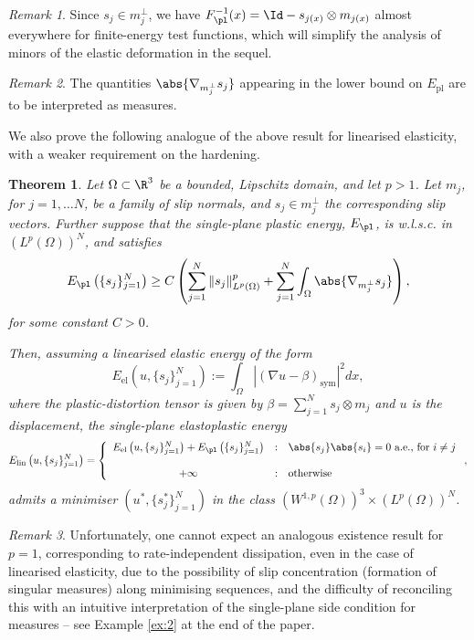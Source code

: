 \documentclass[11pt,reqno]{amsart}
\theoremstyle{plain}
\newtheorem{theorem}{Theorem}
\theoremstyle{definition}
\theoremstyle{remark}
\newtheorem{remark}{Remark}
\begin{document}
\begin{remark}
Since $s_j\in m_j^{\perp}$, we have $F_\pl^{-1}(x) = \Id - s_{j(x)}\otimes m_{j(x)}$ almost everywhere for finite-energy test functions, which will simplify the analysis of minors of the elastic deformation in the sequel.
\end{remark}


\begin{remark}
The quantities $\abs{\nabla_{m_j^\perp} s_j}$ appearing in the lower bound on $E_{\mathrm{pl}}$ are to be interpreted as measures.
\end{remark}

We also prove the following analogue of the above result for linearised elasticity, with a weaker requirement on the hardening.

\begin{theorem}\label{thm:main_lin}
Let $\Omega \subset \R^3$ be a bounded, Lipschitz domain, and let $p>1$. Let $m_j$, for $j=1,\ldots N$, be a family of slip normals, and $s_j\in m_j^{\perp}$ the corresponding slip vectors. Further suppose that the single-plane plastic energy, $E_\pl$, is w.l.s.c. in $(L^p(\Omega))^N$, and satisfies 
\[
E_\pl\left(\{s_j\}_{j=1}^N\right)\geq C\left(\sum_{j=1}^N \|{s_j}\|_{L^p(\Omega)}^p + \sum_{j=1}^N\int_{\Omega}\abs{\nabla_{m_j^\perp} s_j}\right),
\]
for some constant $C>0$.

Then, assuming a linearised elastic energy of the form
\[
E_{\mathrm{el}}\left(u, \{s_j\}_{j=1}^N\right):= \int_{\Omega} \left|(\nabla u - \beta)_{\mathrm{sym}}\right|^2 dx,
\]
where the plastic-distortion tensor is given by $\beta = \sum_{j=1}^N s_j \otimes m_j$ and $u$ is the displacement, the single-plane elastoplastic energy
\[
E_{\mathrm{lin}}\left(u, \{s_j\}_{j=1}^N\right) =  \left\{\begin{array}{ccl}
 E_{\mathrm{el}}\left(u, \{s_j\}_{j=1}^N\right) + E_\pl\left(\{s_j\}_{j=1}^N\right) & : & \abs{s_j}\abs{s_i} = 0~\textrm{a.e., for}~i\neq j\\
 & & \\
 +\infty & : & \mathrm{otherwise}
\end{array} \right.,
\]
admits a minimiser $\left(u^{\ast},\{s^{\ast}_j\}_{j=1}^N\right)$ in the class $(W^{1,p}(\Omega))^3\times (L^p(\Omega))^N$.
\end{theorem}

\begin{remark}
Unfortunately, one cannot expect an analogous existence result for $p=1$, corresponding to rate-independent dissipation, even in the case of linearised elasticity, due to the possibility of slip concentration (formation of singular measures) along minimising sequences, and the difficulty of reconciling this with an intuitive interpretation of the single-plane side condition for measures -- see Example \ref{ex:2} at the end of the paper.
\end{remark}
\end{document}
